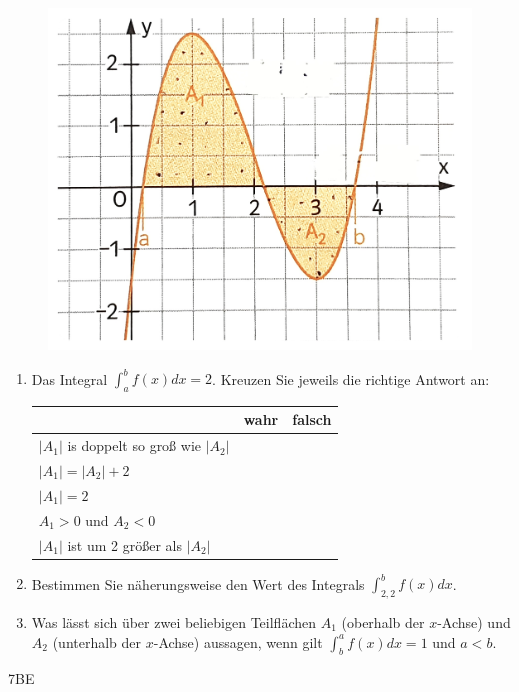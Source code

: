 \documentclass[a4paper,12pt]{article}
\begin{document}
\begin{figure}[h!]
  \centering
  \includegraphics[width=0.5\columnwidth]{Q12_2EX_Integral_1.jpg}
\end{figure}

\begin{enumerate}[label={\alph*)}]
  \item Das Integral $\int_{a}^{b}f(x)dx=2$. Kreuzen Sie jeweils die richtige Antwort an:\\
    \begin{tabular}{ p{7cm} | p{3cm} | p{3cm} | }
      \cline{2-3}
        &wahr & falsch \\
      \hline
      \multicolumn{1}{|l|}{$|A_1|$ is doppelt so groß wie $|A_2|$} &  &  \\ \hline
      \multicolumn{1}{|l|}{$|A_1|=|A_2|+2$} & &  \\ \hline
      \multicolumn{1}{|l|}{$|A_1|=2$} & &  \\ \hline
      \multicolumn{1}{|l|}{$A_1>0$ und $A_2<0$} & &  \\ \hline
      \multicolumn{1}{|l|}{$|A_1|$ ist um 2 größer als $|A_2|$} & &  \\ \hline
    \end{tabular}

  \item Bestimmen Sie näherungsweise den Wert des Integrals $\int_{2,2}^{b} f(x)dx$.
  \item Was lässt sich über zwei beliebigen Teilflächen $A_1$ (oberhalb der $x$-Achse) und $A_2$ (unterhalb der $x$-Achse) aussagen, wenn gilt $\int_{b}^{a}f(x)dx=1$ und $a<b$.
\end{enumerate}
\begin{flushright}7BE \end{flushright}


\end{document}
